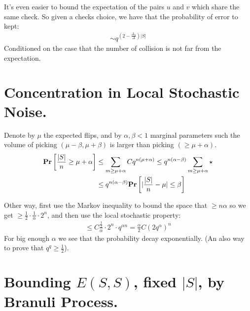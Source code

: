 \documentclass[manuscript,screen,review]{acmart}
\begin{document}
It's even easier to bound the expectation of the pairs $u$ and $v$ which share the same check. So given a checks choice, we have that the probability of error to kept: 
\begin{equation*}
  \begin{split}
  \sim q^{ \left( 2 - \frac{\Delta_{2}}{\Delta} \right) |S| }
  \end{split}
\end{equation*}
Conditioned on the case that the number of collision is not far from the expectation.  


\section{Concentration in Local Stochastic Noise.} 

Denote by $\mu$ the expected flips, and by $\alpha,\beta < 1$ marginal parameters such the volume of picking $(\mu - \beta, \mu + \beta)$ is larger than picking $( \ge \mu + \alpha)$. 
\begin{equation*}
  \begin{split}
    \mathbf{Pr} \left[  \frac{|S|}{n} \ge \mu + \alpha  \right]  & \le \sum_{m \ge \mu + \alpha } Cq^{n(\mu + \alpha)} \le q^{n(\alpha - \beta) }  \sum_{m \ge \mu + \alpha } \star \\ 
      & \le  q^{n(\alpha - \beta) } \mathbf{Pr} \left[   |\frac{|S|}{n} - \mu | \le \beta    \right] 
  \end{split}
\end{equation*}

Other way, first use the Markov inequality to bound the space that $ \ge n\alpha $ so we get $\ge \frac{1}{2} \cdot \frac{1}{\alpha} \cdot 2^{n}$, and then use the local stochastic property:   
\begin{equation*}
  \begin{split}
    \le C \frac{ \frac{1}{2} }{ \alpha } \cdot 2^{n} \cdot q^{\alpha n} = \frac{\alpha}{2} C \left( 2 q^{\alpha} \right)^{n}
  \end{split}
\end{equation*}
For big enough $\alpha$ we see that the probability decay exponentially. (An also way to prove that $q^{q} \ge \frac{1}{2}$). 

\section{Bounding $E(S,S)$, fixed $|S|$, by Branuli Process. } 
\end{document}
